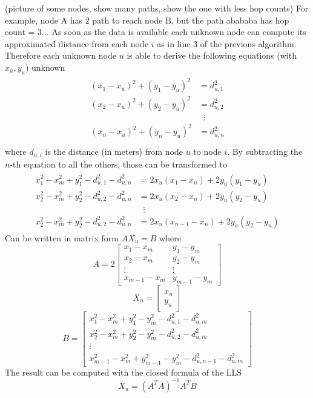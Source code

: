 \documentclass[12pt,twoside]{report}
\begin{document}
(picture of some nodes, show many paths, show the one with less hop counts) For example, node A has 2 path to reach node B, but the path abababa has hop count = 3...
As soon as the data is available each unknown node can compute its approximated distance from each node $i $ as in line $3$ of the previous algorithm. Therefore each unknown node $u$ is able to derive the following equations (with $x_u,y_u$) unknown
\begin{align}
\begin{split} 
(x_1-x_u)^2+(y_1-y_u)^2&=d_{u,1}^2 \\ 
(x_2-x_u)^2+(y_2-y_u)^2&=d_{u,2}^2 \\ 
&\;\;\vdots\\
(x_n-x_u)^2+(y_n-y_u)^2&=d_{u,n}^2 \\
\end{split}
\end{align} 
where $d_{u,i}$ is the distance (in meters) from node $u$ to node $i$.
By subtracting the $n$-th equation to all the others, those can be transformed to
\begin{align}
\begin{split} 
x_1^2-x_m^2+y_1^2-d_{u,1}^2-d_{u,n}^2&=2x_u(x_1-x_n)+2y_u(y_1-y_u)\\ 
x_2^2-x_m^2+y_2^2-d_{u,2}^2-d_{u,n}^2&=2x_u(x_2-x_n)+2y_u(y_2-y_u)\\
&\;\;\vdots\\
x_2^2-x_m^2+y_2^2-d_{u,2}^2-d_{u,n}^2&=2x_u(x_{n-1}-x_n)+2y_u(y_2-y_u)
\end{split}
\end{align}
Can be written in matrix form $AX_u=B$
where 
\begin{equation}
    A=2\begin{bmatrix}
    x_1-x_m & y_1-y_m\\
    x_2-x_m & y_2-y_m\\
    \vdots & \vdots\\
    x_{m-1}-x_m & y_{m-1}-y_m
    \end{bmatrix}
\end{equation}
\begin{equation}
    X_u=\begin{bmatrix}
    x_u\\
    y_u
    \end{bmatrix}
\end{equation}
\begin{equation}
    B=\begin{bmatrix}
        x_{1}^2-x_m^2+y_{1}^2-y_m^2-d_{u,1}^2-d^2_{u,m}\\
        x_{2}^2-x_m^2+y_{2}^2-y_m^2-d_{u,2}^2-d^2_{u,m}\\
        \vdots\\
        x_{m-1}^2-x_m^2+y_{m-1}^2-y_m^2-d_{u,n-1}^2-d^2_{u,m}
    \end{bmatrix}
\end{equation}
The result can be computed with the closed formula of the LLS
\begin{equation}
    X_u=(A^TA)^{-1}A^TB
\end{equation}
\clearpage
\end{document}
